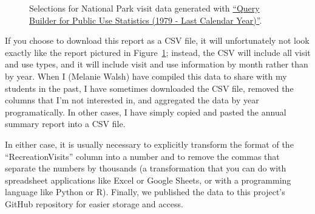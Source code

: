 \documentclass[
  letterpaper,
  DIV=11,
  numbers=noendperiod]{scrartcl}
\begin{document}
\begin{figure}


\caption{\label{fig-query-builder}Selections for National Park visit
data generated with
\href{https://irma.nps.gov/Stats/SSRSReports/National\%20Reports/Query\%20Builder\%20for\%20Public\%20Use\%20Statistics\%20(1979\%20-\%20Last\%20Calendar\%20Year)}{``Query
Builder for Public Use Statistics (1979 - Last Calendar Year)''}.}

\end{figure}%

If you choose to download this report as a CSV file, it will
unfortunately not look exactly like the report pictured in
Figure~\ref{fig-query-builder}; instead, the CSV will include all visit
and use types, and it will include visit and use information by month
rather than by year. When I (Melanie Walsh) have compiled this data to
share with my students in the past, I have sometimes downloaded the CSV
file, removed the columns that I'm not interested in, and aggregated the
data by year programatically. In other cases, I have simply copied and
pasted the annual summary report into a CSV file.

In either case, it is usually necessary to explicitly transform the
format of the ``RecreationVisits'' column into a number and to remove
the commas that separate the numbers by thousands (a transformation that
you can do with spreadsheet applications like Excel or Google Sheets, or
with a programming language like Python or R). Finally, we published the
data to this project's GitHub repository for easier storage and access.
\end{document}
